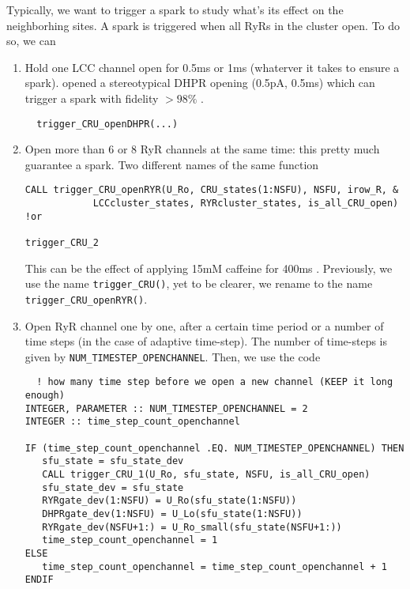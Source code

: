 Typically, we want to trigger a spark to study what's its effect on the
neighborhing sites. A spark is triggered when all RyRs in the cluster open.
To do so, we can
\begin{enumerate}
  \item Hold one LCC channel open for 0.5ms or 1ms (whaterver it takes to ensure
  a spark). \citep{sobie2002tcas} opened a stereotypical DHPR opening (0.5pA,
  0.5ms) which can trigger a spark with fidelity $> 98\%$ \citep{sobie2002tcas}.
  \begin{verbatim}
  trigger_CRU_openDHPR(...)
  \end{verbatim}
  
  \item Open more than 6 or 8 RyR channels at the same time: this pretty much
  guarantee a spark. Two different names of the same function
  \begin{verbatim}
CALL trigger_CRU_openRYR(U_Ro, CRU_states(1:NSFU), NSFU, irow_R, &                                                                                                                                                   
            LCCcluster_states, RYRcluster_states, is_all_CRU_open)    
!or

trigger_CRU_2
  \end{verbatim}
  This can be the effect of applying 15mM caffeine for 400ms \citep{song1997}.
  Previously, we use the name \verb!trigger_CRU()!, yet to be clearer, we rename
  to the name \verb!trigger_CRU_openRYR()!.
  
  \item Open RyR channel one by one, after a certain time period or a number of
  time steps (in the case of adaptive time-step). The number of time-steps is given
  by \verb!NUM_TIMESTEP_OPENCHANNEL!. Then, we use the code
  \begin{verbatim}
  ! how many time step before we open a new channel (KEEP it long enough)
INTEGER, PARAMETER :: NUM_TIMESTEP_OPENCHANNEL = 2 
INTEGER :: time_step_count_openchannel
  
IF (time_step_count_openchannel .EQ. NUM_TIMESTEP_OPENCHANNEL) THEN 
   sfu_state = sfu_state_dev
   CALL trigger_CRU_1(U_Ro, sfu_state, NSFU, is_all_CRU_open)
   sfu_state_dev = sfu_state
   RYRgate_dev(1:NSFU) = U_Ro(sfu_state(1:NSFU))
   DHPRgate_dev(1:NSFU) = U_Lo(sfu_state(1:NSFU))
   RYRgate_dev(NSFU+1:) = U_Ro_small(sfu_state(NSFU+1:))
   time_step_count_openchannel = 1
ELSE
   time_step_count_openchannel = time_step_count_openchannel + 1
ENDIF  
  \end{verbatim}
  
\end{enumerate}


